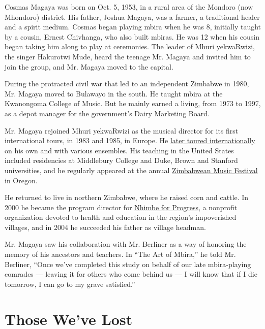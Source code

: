 Cosmas Magaya was born on Oct. 5, 1953, in a rural area of the Mondoro
(now Mhondoro) district. His father, Joshua Magaya, was a farmer, a
traditional healer and a spirit medium. Cosmas began playing mbira when
he was 8, initially taught by a cousin, Ernest Chivhanga, who also built
mbiras. He was 12 when his cousin began taking him along to play at
ceremonies. The leader of Mhuri yekwaRwizi, the singer Hakurotwi Mude,
heard the teenage Mr. Magaya and invited him to join the group, and Mr.
Magaya moved to the capital.

During the protracted civil war that led to an independent Zimbabwe in
1980, Mr. Magaya moved to Bulawayo in the south. He taught mbira at the
Kwanongoma College of Music. But he mainly earned a living, from 1973 to
1997, as a depot manager for the government's Dairy Marketing Board.

Mr. Magaya rejoined Mhuri yekwaRwizi as the musical director for its
first international tours, in 1983 and 1985, in Europe. He
\href{https://www.nytimes.com/1999/11/09/arts/music-review-ancient-resonance-in-twinkling-syncopations.html}{later
toured internationally} on his own and with various ensembles. His
teaching in the United States included residencies at Middlebury College
and Duke, Brown and Stanford universities, and he regularly appeared at
the annual \href{https://zimfest.org/}{Zimbabwean Music Festival} in
Oregon.

He returned to live in northern Zimbabwe, where he raised corn and
cattle. In 2000 he became the program director for
\href{https://ancient-ways.org/regions/zimbabwe-nhimbe-for-progress/}{Nhimbe
for Progress}, a nonprofit organization devoted to health and education
in the region's impoverished villages, and in 2004 he succeeded his
father as village headman.

Mr. Magaya saw his collaboration with Mr. Berliner as a way of honoring
the memory of his ancestors and teachers. In ``The Art of Mbira,'' he
told Mr. Berliner, ``Once we've completed this study on behalf of our
late mbira-playing comrades --- leaving it for others who come behind us
--- I will know that if I die tomorrow, I can go to my grave
satisfied.''

\href{https://www.nytimes.com/interactive/2020/obituaries/people-died-coronavirus-obituaries.html?action=click\&pgtype=Article\&state=default\&region=BELOW_MAIN_CONTENT\&context=covid_obits_promo}{}

\hypertarget{those-weve-lost}{%
\section{Those We've Lost}\label{those-weve-lost}}

